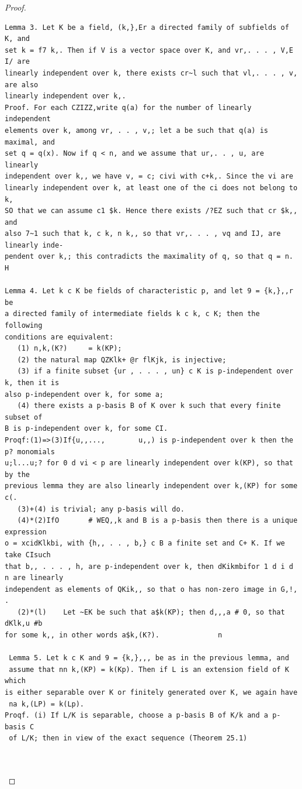 \begin{proof}
\begin{verbatim}
Lemma 3. Let K be a field, (k,},Er a directed family of subfields of K, and
set k = f7 k,. Then if V is a vector space over K, and vr,. . . , V,E I/ are
linearly independent over k, there exists cr~l such that vl,. . . , v, are also
linearly independent over k,.
Proof. For each CZIZZ,write q(a) for the number of linearly independent
elements over k, among vr, . . , v,; let a be such that q(a) is maximal, and
set q = q(x). Now if q < n, and we assume that ur,. . , u, are linearly
independent over k,, we have v, = c; civi with c+k,. Since the vi are
linearly independent over k, at least one of the ci does not belong to k,
SO that we can assume c1 $k. Hence there exists /?EZ such that cr $k,, and
also 7~1 such that k, c k, n k,, so that vr,. . . , vq and IJ, are linearly inde-
pendent over k,; this contradicts the maximality of q, so that q = n. H

Lemma 4. Let k c K be fields of characteristic p, and let 9 = {k,},,r be
a directed family of intermediate fields k c k, c K; then the following
conditions are equivalent:
   (1) n,k,(K?)     = k(KP);
   (2) the natural map QZKlk+ @r flKjk, is injective;
   (3) if a finite subset {ur , . . . , un} c K is p-independent over k, then it is
also p-independent over k, for some a;
   (4) there exists a p-basis B of K over k such that every finite subset of
B is p-independent over k, for some CI.
Proqf:(1)=>(3)If{u,,...,        u,,) is p-independent over k then the p? monomials
u;l...u;? for 0 d vi < p are linearly independent over k(KP), so that by the
previous lemma they are also linearly independent over k,(KP) for some c(.
   (3)+(4) is trivial; any p-basis will do.
   (4)*(2)IfO       # WEQ,,k and B is a p-basis then there is a unique expression
o = xcidKlkbi, with {h,, . . , b,} c B a finite set and C+ K. If we take CIsuch
that b,, . . . , h, are p-independent over k, then dKikmbifor 1 d i d n are linearly
independent as elements of QKik,, so that o has non-zero image in G,!, .
   (2)*(l)    Let ~EK be such that a$k(KP); then d,,,a # 0, so that dKlk,u #b
for some k,, in other words a$k,(K?).              n

 Lemma 5. Let k c K and 9 = {k,},,, be as in the previous lemma, and
 assume that nn k,(KP) = k(Kp). Then if L is an extension field of K which
is either separable over K or finitely generated over K, we again have
 na k,(LP) = k(Lp).
Proqf. (i) If L/K is separable, choose a p-basis B of K/k and a p-basis C
 of L/K; then in view of the exact sequence (Theorem 25.1)



\end{verbatim}
\end{proof}
